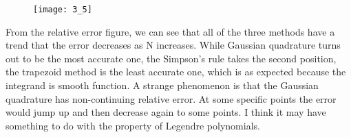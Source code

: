 \documentclass{article}
\begin{document}
\begin{figure} [ht]
\texttt{[image: 3\_5]}
\end{figure}

From the relative error figure, we can see that all of the three methods have a trend that the error decreases as N increases.  While Gaussian quadrature turns out to be the most accurate one, the Simpson's rule takes the second position, the trapezoid method is the least accurate one, which is as expected because the integrand is smooth function.
A strange phenomenon is that the Gaussian quadrature has non-continuing relative error.  At some specific points the error would jump up and then decrease again to some points.   I think it may have something to do with the property of Legendre polynomials.
\end{document}
